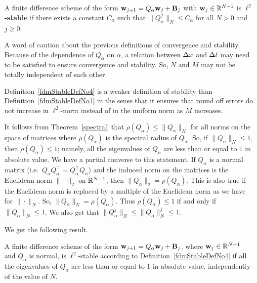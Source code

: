 \begin{defn} \label{fdmStableDefNo4}
A finite difference scheme of the form
$\mathbf{w}_{j+1} = Q_\alpha\mathbf{w}_j + \mathbf{B}_j$
with $\mathbf{w}_j \in \mathbb{R}^{N-1}$ is {\bfseries $\ell^2$-stable}
 if there
exists a constant $C_\alpha$ such that $\|Q_\alpha^j\|_N \leq C_\alpha$
for all $N>0$ and $j\geq 0$.
\end{defn}

A word of caution about the previous definitions of convergence and
stability.  Because of the dependence of $Q_\alpha$ on $\alpha$, a
relation between $\Delta{x}$ and $\Delta{t}$ may need to be satisfied to
ensure convergence and stability.  So, $N$ and 
$M$ may not be totally independent of each other.

Definition~\ref{fdmStableDefNo4} is a weaker
definition of stability than Definition~\ref{fdmStableDefNo1} in the
sense that it ensures that round off errors do not increase in
$\ell^2$-norm instead of in the uniform norm as $M$ increases.

It follows from Theorem~\ref{spectral} that
$\rho(Q_\alpha) \leq \|Q_\alpha\|_N$
for all norms on the space of  matrices where
$\rho(Q_\alpha)$ is the spectral radius of $Q_\alpha$.  So, if
$\|Q_\alpha\|_N\leq 1$, then $\rho(Q_\alpha)\leq 1$; namely, all the
eigenvalues of $Q_\alpha$ are less than or equal to $1$ in absolute
value.   We have a partial converse to this statement.  If $Q_\alpha$
is a normal matrix (i.e.\ $Q_\alpha Q_\alpha^\top = Q_\alpha^\top Q_\alpha$)
and the induced norm on the  matrices is
the Euclidean norm $\|\cdot\|_2$ on $\mathbb{R}^{N-1}$, then
$\|Q_\alpha\|_2 = \rho(Q_\alpha)$.
This is also true if the Euclidean norm is replaced by a multiple of
the Euclidean norm as we have for $\|\cdot\|_N$.  So,
$\|Q_\alpha\|_N = \rho(Q_\alpha)$.
Thus $\rho(Q_\alpha) \leq 1$ if and only if $\|Q_\alpha\|_N \leq 1$.  We also get
that $\|Q_\alpha^j\|_N \leq \|Q_\alpha\|_N^j \leq 1$.

We get the following result.

\begin{prop}\label{MatrixStabProp}
A finite difference scheme of the form
$\mathbf{w}_{j+1} = Q_\alpha\mathbf{w}_j + \mathbf{B}_j$,
where $\mathbf{w}_j \in \mathbb{R}^{N-1}$ and $Q_\alpha$ is normal, is
$\ell^2$-stable according to Definition~\ref{fdmStableDefNo4}
if all the eigenvalues of $Q_\alpha$ are less than or equal to $1$ in
absolute value, independently of the value of $N$.
\end{prop}

